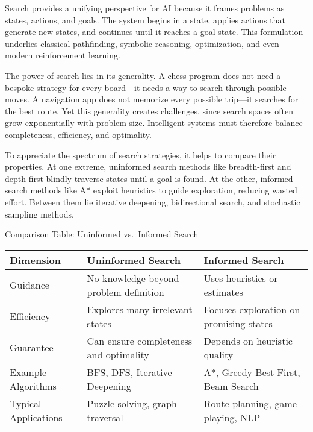 \documentclass[
  letterpaper,
  DIV=11,
  numbers=noendperiod]{scrreprt}
\begin{document}
Search provides a unifying perspective for AI because it frames problems
as states, actions, and goals. The system begins in a state, applies
actions that generate new states, and continues until it reaches a goal
state. This formulation underlies classical pathfinding, symbolic
reasoning, optimization, and even modern reinforcement learning.

The power of search lies in its generality. A chess program does not
need a bespoke strategy for every board---it needs a way to search
through possible moves. A navigation app does not memorize every
possible trip---it searches for the best route. Yet this generality
creates challenges, since search spaces often grow exponentially with
problem size. Intelligent systems must therefore balance completeness,
efficiency, and optimality.

To appreciate the spectrum of search strategies, it helps to compare
their properties. At one extreme, uninformed search methods like
breadth-first and depth-first blindly traverse states until a goal is
found. At the other, informed search methods like A* exploit heuristics
to guide exploration, reducing wasted effort. Between them lie iterative
deepening, bidirectional search, and stochastic sampling methods.

Comparison Table: Uninformed vs.~Informed Search

\begin{longtable}[]{@{}
  >{\raggedright\arraybackslash}p{}
  >{\raggedright\arraybackslash}p{}
  >{\raggedright\arraybackslash}p{}@{}}
\toprule\noalign{}
\begin{minipage}[b]{\linewidth}\raggedright
Dimension
\end{minipage} & \begin{minipage}[b]{\linewidth}\raggedright
Uninformed Search
\end{minipage} & \begin{minipage}[b]{\linewidth}\raggedright
Informed Search
\end{minipage} \\
\midrule\noalign{}
\endhead
\bottomrule\noalign{}
\endlastfoot
Guidance & No knowledge beyond problem definition & Uses heuristics or
estimates \\
Efficiency & Explores many irrelevant states & Focuses exploration on
promising states \\
Guarantee & Can ensure completeness and optimality & Depends on
heuristic quality \\
Example Algorithms & BFS, DFS, Iterative Deepening & A*, Greedy
Best-First, Beam Search \\
Typical Applications & Puzzle solving, graph traversal & Route planning,
game-playing, NLP \\
\end{longtable}
\end{document}
